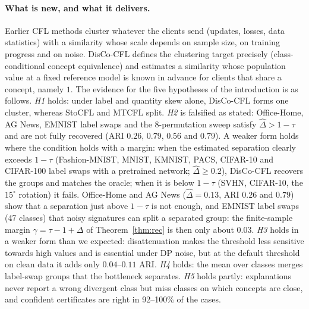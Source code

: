 \paragraph{What is new, and what it delivers.} Earlier CFL methods cluster whatever the clients send (updates, losses, data statistics) with a similarity whose scale depends on sample size, on training progress and on noise. DisCo-CFL defines the clustering target precisely (class-conditional concept equivalence) and estimates a similarity whose population value at a fixed reference model is known in advance for clients that share a concept, namely $1$. The evidence for the five hypotheses of the introduction is as follows. \emph{H1} holds: under label and quantity skew alone, DisCo-CFL forms one cluster, whereas StoCFL and MTCFL split. \emph{H2} is falsified as stated: Office-Home, AG News, EMNIST label swaps and the 8-permutation sweep satisfy $\hat\Delta>1-\tau$ and are not fully recovered (ARI $0.26$, $0.79$, $0.56$ and $0.79$). A weaker form holds where the condition holds with a margin: when the estimated separation clearly exceeds $1-\tau$ (Fashion-MNIST, MNIST, KMNIST, PACS, CIFAR-10 and CIFAR-100 label swaps with a pretrained network; $\hat\Delta\ge0.2$), DisCo-CFL recovers the groups and matches the oracle; when it is below $1-\tau$ (SVHN, CIFAR-10, the $15^\circ$ rotation) it fails. Office-Home and AG News ($\hat\Delta=0.13$, ARI $0.26$ and $0.79$) show that a separation just above $1-\tau$ is not enough, and EMNIST label swaps (47 classes) that noisy signatures can split a separated group: the finite-sample margin $\gamma=\tau-1+\Delta$ of Theorem~\ref{thm:rec} is then only about $0.03$. \emph{H3} holds in a weaker form than we expected: disattenuation makes the threshold less sensitive towards high values and is essential under DP noise, but at the default threshold on clean data it adds only $0.04$--$0.11$ ARI. \emph{H4} holds: the mean over classes merges label-swap groups that the bottleneck separates. \emph{H5} holds partly: explanations never report a wrong divergent class but miss classes on which concepts are close, and confident certificates are right in 92--100\% of the cases.

